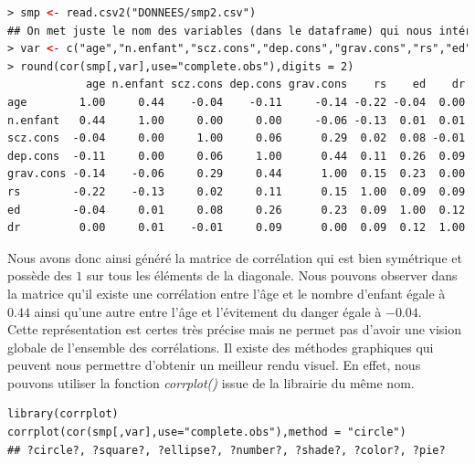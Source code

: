 \begin{lstlisting}[language=html]
> smp <- read.csv2("DONNEES/smp2.csv")
## On met juste le nom des variables (dans le dataframe) qui nous intéressent.
> var <- c("age","n.enfant","scz.cons","dep.cons","grav.cons","rs","ed","dr")
> round(cor(smp[,var],use="complete.obs"),digits = 2)
            age n.enfant scz.cons dep.cons grav.cons    rs    ed    dr
age        1.00     0.44    -0.04    -0.11     -0.14 -0.22 -0.04  0.00
n.enfant   0.44     1.00     0.00     0.00     -0.06 -0.13  0.01  0.01
scz.cons  -0.04     0.00     1.00     0.06      0.29  0.02  0.08 -0.01
dep.cons  -0.11     0.00     0.06     1.00      0.44  0.11  0.26  0.09
grav.cons -0.14    -0.06     0.29     0.44      1.00  0.15  0.23  0.00
rs        -0.22    -0.13     0.02     0.11      0.15  1.00  0.09  0.09
ed        -0.04     0.01     0.08     0.26      0.23  0.09  1.00  0.12
dr         0.00     0.01    -0.01     0.09      0.00  0.09  0.12  1.00
\end{lstlisting}
Nous avons donc ainsi généré la matrice de corrélation qui est bien symétrique et possède des $1$ sur tous les éléments de la diagonale. Nous pouvons observer dans la matrice qu'il existe une corrélation entre l'âge et le nombre d'enfant égale à $0.44$ ainsi qu'une autre entre l'âge et l'évitement du danger égale à $-0.04$.\newline
\\
Cette représentation est certes très précise mais ne permet pas d'avoir une vision globale de l'ensemble des corrélations. Il existe des méthodes graphiques qui peuvent nous permettre d'obtenir un meilleur rendu visuel.\newline
En effet, nous pouvons utiliser la fonction \textit{corrplot()} issue de la librairie du même nom.
\begin{lstlisting}[language=html]
library(corrplot)
corrplot(cor(smp[,var],use="complete.obs"),method = "circle")
## ?circle?, ?square?, ?ellipse?, ?number?, ?shade?, ?color?, ?pie?
\end{lstlisting}

